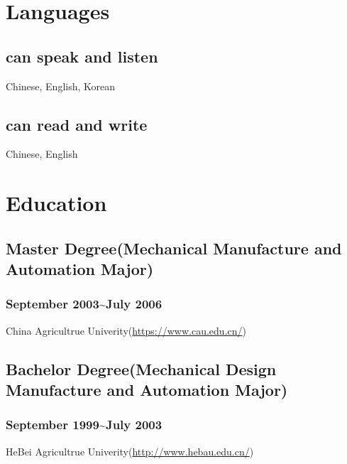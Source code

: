 \documentclass{article}
\begin{document}
\section{Languages}

\subsection{can speak and listen}
Chinese, English, Korean

\subsection{can read and write}
Chinese, English


\section{Education}

\subsection{Master Degree(Mechanical Manufacture and Automation Major)}
\subsubsection{September 2003\~{}July 2006}
China Agricultrue Univerity(\url{https://www.cau.edu.cn/})

\subsection{Bachelor Degree(Mechanical Design Manufacture and Automation Major)}
\subsubsection{September 1999\~{}July 2003}
HeBei Agricultrue Univerity(\url{http://www.hebau.edu.cn/})

\end{document}
